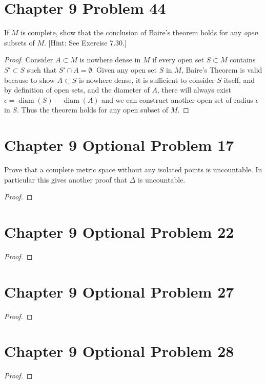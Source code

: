 \documentclass{article}
\newtheorem{proof}{Proof}
\def\diam{\operatorname{diam}}
\begin{document}
\section{Chapter 9 Problem 44}
If $M$ is complete, show that the conclusion of Baire's theorem holds
for any \emph{open} subsets of $M$. [Hint: See Exercise 7.30.]
\begin{proof}
Consider $A\subset M$ is nowhere dense in $M$ if every open set
$S\subset M$ contains $S'\subset S$ such that $S'\cap A=\emptyset$.
Given any open set $S$ in $M$, Baire's Theorem is valid because
to show $A\subset S$ is nowhere dense, it is sufficient to consider
$S$ itself, and by definition of open sets, and the diameter of $A$, there
will always exist $\epsilon = \diam(S)-\diam(A)$ and we can construct
another open set of radius $\epsilon$ in $S$. Thus the theorem
holds for any open subset of $M$.
\end{proof}

\section{Chapter 9 Optional Problem 17}
Prove that a complete metric space without any isolated points
is uncountable. In particular this gives another proof that
$\Delta$ is uncountable.
\begin{proof}

\end{proof}

\section{Chapter 9 Optional Problem 22}
\begin{proof}

\end{proof}

\section{Chapter 9 Optional Problem 27}
\begin{proof}

\end{proof}

\section{Chapter 9 Optional Problem 28}
\begin{proof}

\end{proof}
\end{document}
